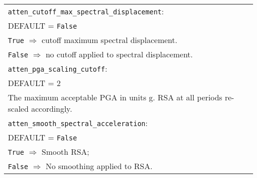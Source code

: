\begin{tabular}{|p{\textwidth}|}
\hline
 \hspace{0.5em} \texttt{atten\_cutoff\_max\_spectral\_displacement}: \\
DEFAULT = \texttt{False} \\
\hspace{0.5em} \texttt{True} $\Rightarrow$ cutoff maximum spectral displacement. \\
\hspace{0.5em} \texttt{False} $\Rightarrow$ no cutoff applied to spectral displacement. \\
\hline \vspace{0.1em} \texttt{atten\_pga\_scaling\_cutoff}: \\
DEFAULT = 2 \\
The maximum acceptable PGA in units g. RSA at all periods re-scaled accordingly.      \\
\hline \vspace{0.1em}
\texttt{atten\_smooth\_spectral\_acceleration}: \\
DEFAULT = \texttt{False} \\
\hspace{0.5em} \texttt{True} $\Rightarrow$  Smooth RSA; \\
\hspace{0.5em} \texttt{False} $\Rightarrow$  No smoothing applied to RSA. \\
\hline
 \end{tabular}

